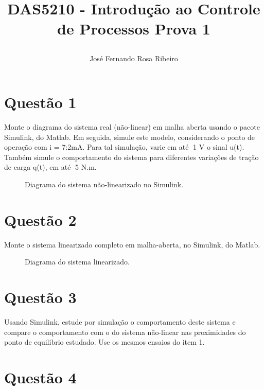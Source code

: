 \documentclass[11pt]{article}
\begin{document}
\begin{header_}
\author{
José Fernando Rosa Ribeiro
}
\title{DAS5210 - Introdução ao Controle de Processos 
\newline
\newline
\large Prova 1
\date{\vspace{-5ex}}}
\maketitle
\setcounter{secnumdepth}{0}
\end{header_}

\section{Questão 1}
Monte o diagrama do sistema real (não-linear) em malha aberta usando o pacote Simulink, do
Matlab. Em seguida, simule este modelo, considerando o ponto de operação com i = 7:2mA. Para
tal simulação, varie em até 1 V o sinal u(t). Também simule o comportamento do sistema para
diferentes variações de tração de carga q(t), em até 5 N.m.

     \begin{figure}[!htb]
        \caption{\label{fig:my-label} Diagrama do sistema não-linearizado no Simulink.}
      \end{figure}
\section{Questão 2}
Monte o sistema linearizado completo em malha-aberta, no Simulink, do Matlab.
     \begin{figure}[!htb]
        \caption{\label{fig:my-label} Diagrama do sistema linearizado.}
      \end{figure}
\section{Questão 3}
Usando Simulink, estude por simulação o comportamento deste sistema e compare o comportamento
com o do sistema não-linear nas proximidades do ponto de equilibrio estudado. Use os mesmos ensaios
do item 1.

\section{Questão 4}
\end{document}

